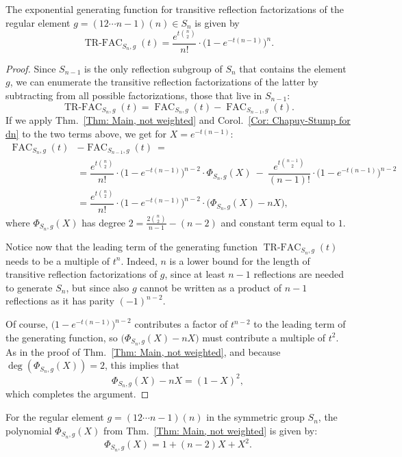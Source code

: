 \documentclass[ALCO, Unicode]{cedram}
\newcommand{\op}[1]{\operatorname{#1}}
\newcommand{\op}[1]{\operatorname{#1}}
\begin{document}
\begin{prop}\label{Prop: transitive factorizations enum.}
The exponential generating function for transitive reflection factorizations of the regular element $g=(12\cdots n-1)(n)\in S_n$ is given by $$\op{TR-FAC}_{S_n,g}(t)=\dfrac{e^{t\binom{n}{2}}}{n!}\cdot \big( 1-e^{-t(n-1)}\big)^{n}. $$
\end{prop}
\begin{proof}
Since $S_{n-1}$ is the only reflection subgroup of $S_n$ that contains the element $g$, we can enumerate the transitive reflection factorizations of the latter by subtracting from all possible factorizations, those that live in $S_{n-1}$:$$
\op{TR-FAC}_{S_n,g}(t)=\op{FAC}_{S_n,g}(t)-\op{FAC}_{S_{n-1},g}(t).$$ If we apply Thm.~\ref{Thm: Main, not weighted} and Corol.~\ref{Cor: Chapuy-Stump for dn} to the two terms above, we get for $X=e^{-t(n-1)}$:
\begin{align*}
\op{FAC}_{S_n,g}(t)&-\op{FAC}_{S_{n-1},g}(t)\ =\\
&= \dfrac{e^{t\binom{n}{2}}}{n!}\cdot \big(1-e^{-t(n-1)}\big)^{n-2}\cdot\Phi_{S_n,g}(X) \ - \ \dfrac{e^{t\binom{n-1}{2}}}{(n-1)!}\cdot \big( 1-e^{-t(n-1)}\big)^{n-2}\\
&= \dfrac{e^{t\binom{n}{2}}}{n!}\cdot\big(1-e^{-t(n-1)}\big)^{n-2}\cdot\big( \Phi_{S_n,g}(X)-nX\big),
\end{align*}where $\Phi_{S_n,g}(X)$ has degree $2=\frac{2\binom{n}{2}}{n-1}-(n-2)$ and constant term equal to $1$.

Notice now that the leading term of the generating function $\op{TR-FAC}_{S_n,g}(t)$ needs to be a multiple of $t^n$. Indeed, $n$ is a lower bound for the length of transitive reflection factorizations of $g$, since at least $n-1$ reflections are needed to generate $S_n$, but since also $g$ cannot be written as a product of $n-1$ reflections as it has parity $(-1)^{n-2}$.

Of course, $\big( 1-e^{-t(n-1)}\big)^{n-2}$ contributes a factor of $t^{n-2}$ to the leading term of the generating function, so $\big(\Phi_{S_n,g}(X)-nX\big)$ must contribute a multiple of $t^2$. As in the proof of Thm.~\ref{Thm: Main, not weighted}, and because $\op{deg}(\Phi_{S_n,g}(X))=2$, this implies that $$\Phi_{S_n,g}(X)-nX=(1-X)^2,$$ which completes the argument.
\end{proof}


\begin{coro}\label{Corol: last of theorem}
For the regular element $g=(12\cdots n-1)(n)$ in the symmetric group $S_n$, the polynomial $\Phi_{S_n,g}(X)$ from Thm.~\ref{Thm: Main, not weighted} is given by:$$
\Phi_{S_n,g}(X)=1+(n-2)X+X^2.$$
\end{coro}
\end{document}

